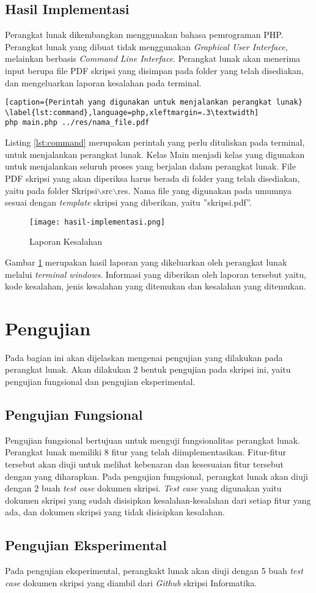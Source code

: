 \subsection{Hasil Implementasi}
Perangkat lunak dikembangkan menggunakan bahasa pemrograman PHP. Perangkat lunak yang dibuat tidak menggunakan \textit{Graphical User Interface}, melainkan berbasis \textit{Command Line Interface}. Perangkat lunak akan menerima input berupa file PDF skripsi yang disimpan pada folder yang telah disediakan, dan mengeluarkan laporan kesalahan pada terminal.

\begin{lstlisting}[caption={Perintah yang digunakan untuk menjalankan perangkat lunak}	\label{lst:command},language=php,xleftmargin=.3\textwidth] 
php main.php ../res/nama_file.pdf
\end{lstlisting}
\medskip

Listing \ref{lst:command} merupakan perintah yang perlu dituliskan pada terminal, untuk menjalankan perangkat lunak. Kelas Main menjadi kelas yang digunakan untuk menjalankan seluruh proses yang berjalan dalam perangkat lunak. File PDF skripsi yang akan diperiksa harus berada di folder yang telah disediakan, yaitu pada folder Skripsi$\backslash$src$\backslash$res. Nama file yang digunakan pada umumnya sesuai dengan \textit{template} skripsi yang diberikan, yaitu ''skripsi.pdf''.

\begin{figure}[H]
	\centering	
	\texttt{[image: hasil-implementasi.png]}
	\caption{Laporan Kesalahan}	
	\label{fig:error_report} 
\end{figure}

Gambar \ref{fig:error_report} merupakan hasil laporan yang dikeluarkan oleh perangkat lunak melalui \textit{terminal windows}. Informasi yang diberikan oleh laporan tersebut yaitu, kode kesalahan, jenis kesalahan yang ditemukan dan kesalahan yang ditemukan.

\section{Pengujian}
Pada bagian ini akan dijelaskan mengenai pengujian yang dilakukan pada perangkat lunak. Akan dilakukan 2 bentuk pengujian pada skripsi ini, yaitu pengujian fungsional dan pengujian eksperimental.

\subsection{Pengujian Fungsional}
Pengujian fungsional bertujuan untuk menguji fungsionalitas perangkat lunak. Perangkat lunak memiliki 8 fitur yang telah diimplementasikan. Fitur-fitur tersebut akan diuji untuk melihat kebenaran dan kesesuaian fitur tersebut dengan yang diharapkan. Pada pengujian fungsional, perangkat lunak akan diuji dengan 2 buah \textit{test case} dokumen skripsi. \textit{Test case} yang digunakan yaitu dokumen skripsi yang sudah disisipkan kesalahan-kesalahan dari setiap fitur yang ada, dan dokumen skripsi yang tidak disisipkan kesalahan.

\subsection{Pengujian Eksperimental}
Pada pengujian eksperimental, perangkakt lunak akan diuji dengan 5 buah \textit{test case} dokumen skripsi yang diambil dari \textit{Github} skripsi Informatika.
